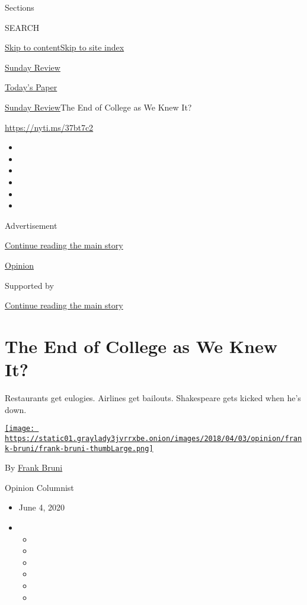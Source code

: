 Sections

SEARCH

\protect\hyperlink{site-content}{Skip to
content}\protect\hyperlink{site-index}{Skip to site index}

\href{https://www.nytimes3xbfgragh.onion/section/opinion/sunday}{Sunday
Review}

\href{https://myaccount.nytimes3xbfgragh.onion/auth/login?response_type=cookie\&client_id=vi}{}

\href{https://www.nytimes3xbfgragh.onion/section/todayspaper}{Today's
Paper}

\href{/section/opinion/sunday}{Sunday Review}\textbar{}The End of
College as We Knew It?

\href{https://nyti.ms/37bt7c2}{https://nyti.ms/37bt7c2}

\begin{itemize}
\item
\item
\item
\item
\item
\item
\end{itemize}

Advertisement

\protect\hyperlink{after-top}{Continue reading the main story}

\href{/section/opinion}{Opinion}

Supported by

\protect\hyperlink{after-sponsor}{Continue reading the main story}

\hypertarget{the-end-of-college-as-we-knew-it}{%
\section{The End of College as We Knew
It?}\label{the-end-of-college-as-we-knew-it}}

Restaurants get eulogies. Airlines get bailouts. Shakespeare gets kicked
when he's down.

\href{https://www.nytimes3xbfgragh.onion/by/frank-bruni}{\texttt{[image: https://static01.graylady3jvrrxbe.onion/images/2018/04/03/opinion/frank-bruni/frank-bruni-thumbLarge.png]}}

By \href{https://www.nytimes3xbfgragh.onion/by/frank-bruni}{Frank Bruni}

Opinion Columnist

\begin{itemize}
\item
  June 4, 2020
\item
  \begin{itemize}
  \item
  \item
  \item
  \item
  \item
  \item
  \end{itemize}
\end{itemize}

